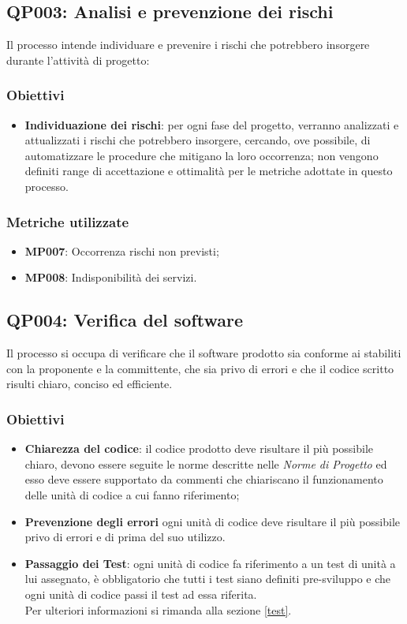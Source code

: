 \subsection{QP003: Analisi e prevenzione dei rischi}
Il processo intende individuare e prevenire i rischi che potrebbero insorgere durante l'attività di progetto:

\subsubsection{Obiettivi}
\begin{itemize}
	\item \textbf{Individuazione dei rischi}: per ogni fase del progetto, verranno analizzati e attualizzati i rischi che potrebbero insorgere, cercando, ove possibile, di automatizzare le procedure che mitigano la loro occorrenza; non vengono definiti range di accettazione e ottimalità per le metriche adottate in questo processo.
\end{itemize}

\subsubsection{Metriche utilizzate}
\begin{itemize}	
	\item \textbf{MP007}: Occorrenza rischi non previsti;
	\item \textbf{MP008}: Indisponibilità dei servizi.
\end{itemize}
\subsection{QP004: Verifica del software}
Il processo si occupa di verificare che il software prodotto sia conforme ai  stabiliti con la proponente e la committente, che sia privo di errori e che il codice scritto risulti chiaro, conciso ed efficiente.
\subsubsection{Obiettivi}
\begin{itemize}
	\item \textbf{Chiarezza del codice}: il codice prodotto deve risultare il più possibile chiaro, devono essere seguite le norme descritte nelle \textit{Norme di Progetto} ed esso deve essere supportato da commenti che chiariscano il funzionamento delle unità di codice a cui fanno riferimento;
	\item \textbf{Prevenzione degli errori} ogni unità di codice deve risultare il più possibile privo di errori e di  prima del suo utilizzo.
	\item \textbf{Passaggio dei Test}: ogni unità di codice fa riferimento a un test di unità a lui assegnato, è obbligatorio che tutti i test siano definiti pre-sviluppo e che ogni unità di codice passi il test ad essa riferita.\\
	Per ulteriori informazioni si rimanda alla sezione \ref{test}.
\end{itemize}
